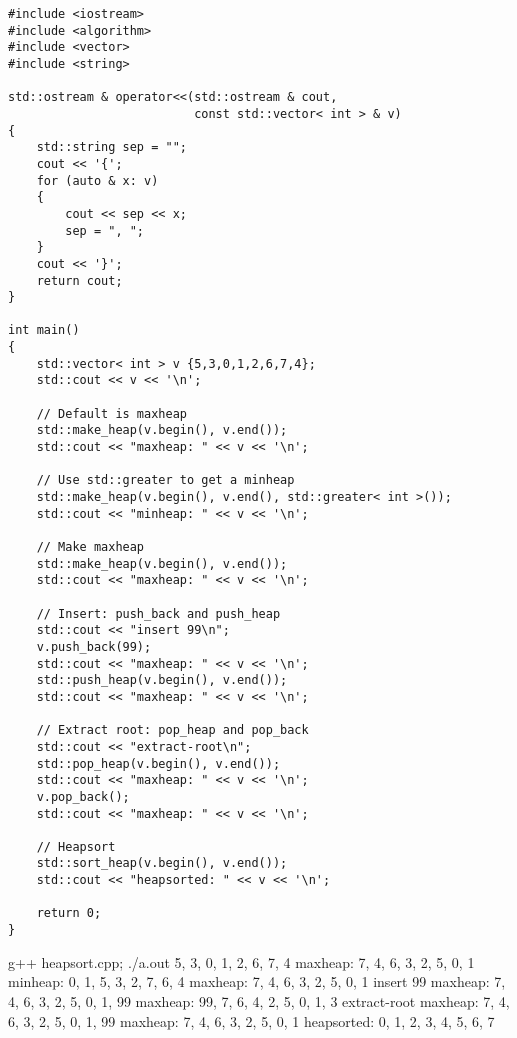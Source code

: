 
\begin{Verbatim}[frame=single, fontsize=\small]
#include <iostream>
#include <algorithm>
#include <vector>
#include <string>

std::ostream & operator<<(std::ostream & cout, 
                          const std::vector< int > & v)
{
    std::string sep = "";
    cout << '{';
    for (auto & x: v)
    {
        cout << sep << x;
        sep = ", ";
    }
    cout << '}';
    return cout;
}

int main()
{
    std::vector< int > v {5,3,0,1,2,6,7,4};
    std::cout << v << '\n';

    // Default is maxheap
    std::make_heap(v.begin(), v.end());
    std::cout << "maxheap: " << v << '\n';

    // Use std::greater to get a minheap
    std::make_heap(v.begin(), v.end(), std::greater< int >());
    std::cout << "minheap: " << v << '\n';

    // Make maxheap
    std::make_heap(v.begin(), v.end());
    std::cout << "maxheap: " << v << '\n';
    
    // Insert: push_back and push_heap
    std::cout << "insert 99\n";
    v.push_back(99);
    std::cout << "maxheap: " << v << '\n';
    std::push_heap(v.begin(), v.end());
    std::cout << "maxheap: " << v << '\n';

    // Extract root: pop_heap and pop_back
    std::cout << "extract-root\n";
    std::pop_heap(v.begin(), v.end());
    std::cout << "maxheap: " << v << '\n';
    v.pop_back();
    std::cout << "maxheap: " << v << '\n';

    // Heapsort
    std::sort_heap(v.begin(), v.end());
    std::cout << "heapsorted: " << v << '\n';
    
    return 0;
}
\end{Verbatim}

{\footnotesize \begin{console} g++ heapsort.cpp; ./a.out
{5, 3, 0, 1, 2, 6, 7, 4}
maxheap: {7, 4, 6, 3, 2, 5, 0, 1}
minheap: {0, 1, 5, 3, 2, 7, 6, 4}
maxheap: {7, 4, 6, 3, 2, 5, 0, 1}
insert 99
maxheap: {7, 4, 6, 3, 2, 5, 0, 1, 99}
maxheap: {99, 7, 6, 4, 2, 5, 0, 1, 3}
extract-root
maxheap: {7, 4, 6, 3, 2, 5, 0, 1, 99}
maxheap: {7, 4, 6, 3, 2, 5, 0, 1}
heapsorted: {0, 1, 2, 3, 4, 5, 6, 7}
\end{console}
}
